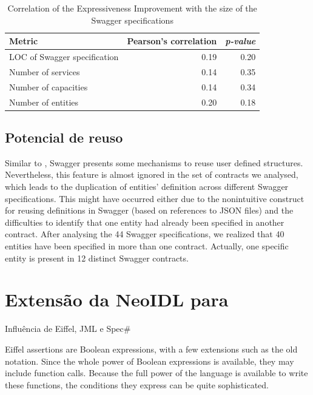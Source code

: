 \begin{table}[htb]
\caption{Correlation of the Expressiveness Improvement with the size of the Swagger specifications}
\begin{center}
\begin{tabular}{lrr} 
\toprule
Metric & Pearson's correlation & \emph{p-value} \\ \hline \hline 
LOC of Swagger specification & 0.19 &  0.20 \\ 
Number of services & 0.14 & 0.35 \\ 
Number of capacities & 0.14 & 0.34 \\
Number of entities & 0.20 & 0.18 \\ \bottomrule 
\end{tabular} 
\end{center}
\label{tab:size-corr}
\end{table}





\subsection{Potencial de reuso}



Similar to \neoidl{}, Swagger presents 
some mechanisms to reuse user defined structures. Nevertheless, 
this feature is almost ignored in the set of contracts we analysed, which 
leads to the duplication of entities' definition across different 
Swagger specifications. This might have occurred either due to the 
nonintuitive construct for reusing definitions in Swagger (based on 
references to JSON files) and the difficulties to identify 
that one entity had already been specified in another contract.
After analysing the 44 Swagger specifications, we realized that 40 entities 
have been specified in  more than one contract. Actually, one specific 
entity is present in 12 distinct Swagger contracts. 




 
\section{Extensão da NeoIDL para \designbycontract{}}

Influência de Eiffel, JML e Spec\#

Eiffel assertions are Boolean expressions, with a few extensions such as the old
notation. Since the whole power of Boolean expressions is available, they may
include function calls. Because the full power of the language is available to
write these functions, the conditions they express can be quite sophisticated.
\cite{meyer1992applying}

